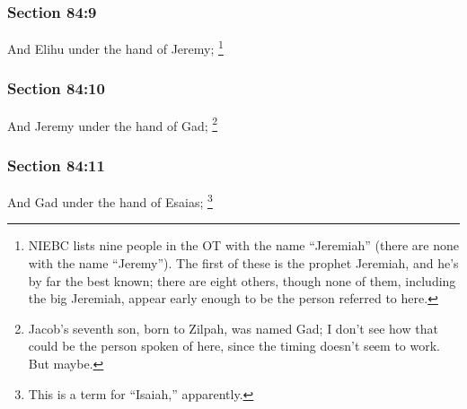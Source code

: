 	\subsubsection{Section 84:9} %
		\label{DC84-9}

		And Elihu under the hand of Jeremy;%
			\footnote{%
				NIEBC lists nine people in the OT with the name ``Jeremiah'' (there are none with the name ``Jeremy''). The first of these is the prophet Jeremiah, and he's by far the best known; there are eight others, though none of them, including the big Jeremiah, appear early enough to be the person referred to here.
				}


	\subsubsection{Section 84:10} %
		\label{DC84-10}

		And Jeremy under the hand of Gad;%
			\footnote{%
				Jacob's seventh son, born to Zilpah, was named Gad; I don't see how that could be the person spoken of here, since the timing doesn't seem to work. But maybe.
				}


	\subsubsection{Section 84:11} %
		\label{DC84-11}

		And Gad under the hand of Esaias;%
			\footnote{%
				This is a term for ``Isaiah,'' apparently.
				}

